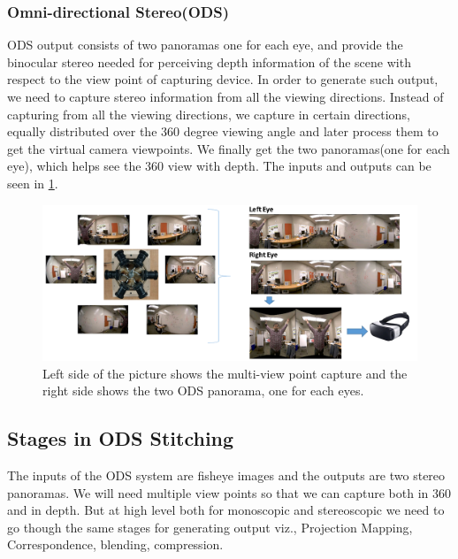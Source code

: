 \subsubsection{Omni-directional Stereo(ODS)}
ODS output consists of two panoramas one for each eye, and provide the binocular stereo needed for perceiving depth information of the scene with respect to the view point of capturing device. In order to generate such output, we need to capture stereo information from all the viewing directions. Instead of capturing from all the viewing directions, we capture in certain directions, equally distributed over the 360 degree viewing angle and later process them to get the virtual camera viewpoints. We finally get the two panoramas(one for each eye), which helps see the 360 view with depth. The inputs and outputs can be seen in \ref{fig:ODS_IO}.

\begin{figure}[h]
	\begin{center}
		\includegraphics[width=1\textwidth]{data/images/ODS_IO_images.png}
	\end{center}
		\caption{Left side of the picture shows the multi-view point capture and the right side shows the two ODS panorama, one for each eyes.}	
\label{fig:ODS_IO}
\end{figure} 

\subsection{Stages in ODS Stitching}
The inputs of the ODS system are fisheye images and the outputs are two stereo panoramas. We will need multiple view points so that we can capture both in 360 and in depth. But at high level both for monoscopic and stereoscopic we need to go though the same stages for generating output viz., Projection Mapping, Correspondence, blending, compression.
